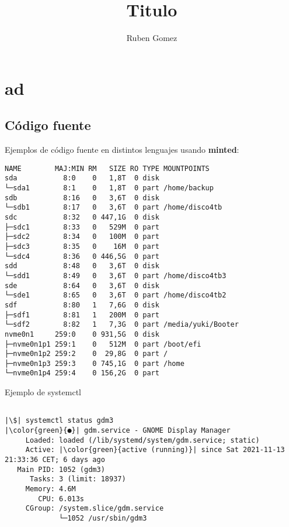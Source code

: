 \documentclass[12pt,a4paper,openany]{book}
\author{Ruben Gomez}
\title{Titulo}
\begin{document}
\maketitle

\tableofcontents

\part{ad}

\chapter{Código fuente}
Ejemplos de código fuente en distintos lenguajes usando \textbf{minted}:

\begin{verbatim}
NAME        MAJ:MIN RM   SIZE RO TYPE MOUNTPOINTS
sda           8:0    0   1,8T  0 disk 
└─sda1        8:1    0   1,8T  0 part /home/backup
sdb           8:16   0   3,6T  0 disk 
└─sdb1        8:17   0   3,6T  0 part /home/disco4tb
sdc           8:32   0 447,1G  0 disk 
├─sdc1        8:33   0   529M  0 part 
├─sdc2        8:34   0   100M  0 part 
├─sdc3        8:35   0    16M  0 part 
└─sdc4        8:36   0 446,5G  0 part 
sdd           8:48   0   3,6T  0 disk 
└─sdd1        8:49   0   3,6T  0 part /home/disco4tb3
sde           8:64   0   3,6T  0 disk 
└─sde1        8:65   0   3,6T  0 part /home/disco4tb2
sdf           8:80   1   7,6G  0 disk 
├─sdf1        8:81   1   200M  0 part 
└─sdf2        8:82   1   7,3G  0 part /media/yuki/Booter
nvme0n1     259:0    0 931,5G  0 disk 
├─nvme0n1p1 259:1    0   512M  0 part /boot/efi
├─nvme0n1p2 259:2    0  29,8G  0 part /
├─nvme0n1p3 259:3    0 745,1G  0 part /home
└─nvme0n1p4 259:4    0 156,2G  0 part 

\end{verbatim}

Ejemplo de systemctl
\begin{verbatim}

|\$| systemctl status gdm3 
|\color{green}{●}| gdm.service - GNOME Display Manager
     Loaded: loaded (/lib/systemd/system/gdm.service; static)
     Active: |\color{green}{active (running)}| since Sat 2021-11-13 21:33:36 CET; 6 days ago
   Main PID: 1052 (gdm3)
      Tasks: 3 (limit: 18937)
     Memory: 4.6M
        CPU: 6.013s
     CGroup: /system.slice/gdm.service
             └─1052 /usr/sbin/gdm3

\end{verbatim}
\end{document}
